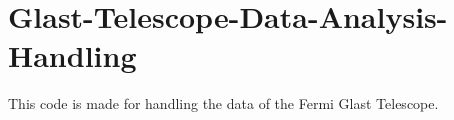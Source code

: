 \chapter{Glast-\/\+Telescope-\/\+Data-\/\+Analysis-\/\+Handling}
\hypertarget{md_README}{}\label{md_README}
\label{md_README_autotoc_md0}%
%
This code is made for handling the data of the Fermi Glast Telescope. 